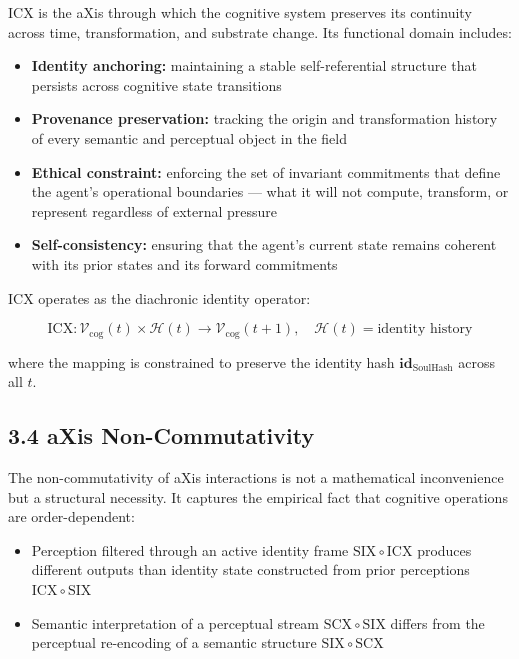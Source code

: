 ICX is the aXis through which the cognitive system preserves its continuity across time, transformation, and substrate change. Its functional domain includes:

\begin{itemize}
\tightlist
\item
  \textbf{Identity anchoring:} maintaining a stable self-referential structure that persists across cognitive state transitions
\item
  \textbf{Provenance preservation:} tracking the origin and transformation history of every semantic and perceptual object in the field
\item
  \textbf{Ethical constraint:} enforcing the set of invariant commitments that define the agent's operational boundaries --- what it will not compute, transform, or represent regardless of external pressure
\item
  \textbf{Self-consistency:} ensuring that the agent's current state remains coherent with its prior states and its forward commitments
\end{itemize}

ICX operates as the diachronic identity operator:

\[
\mathrm{ICX}: \mathcal{V}_{\text{cog}}(t) \times \mathcal{H}(t) \rightarrow
\mathcal{V}_{\text{cog}}(t+1), \quad \mathcal{H}(t) = \text{identity history}
\]

where the mapping is constrained to preserve the identity hash \(\mathbf{id}_{\text{SoulHash}}\) across all \(t\).

\subsection{3.4 aXis Non-Commutativity}\label{axis-non-commutativity}

The non-commutativity of aXis interactions is not a mathematical inconvenience but a structural necessity. It captures the empirical fact that cognitive operations are order-dependent:

\begin{itemize}
\tightlist
\item
  Perception filtered through an active identity frame \(\mathrm{SIX} \circ
  \mathrm{ICX}\) produces different outputs than identity state constructed from prior perceptions \(\mathrm{ICX} \circ \mathrm{SIX}\)
\item
  Semantic interpretation of a perceptual stream \(\mathrm{SCX} \circ \mathrm{SIX}\) differs from the perceptual re-encoding of a semantic structure \(\mathrm{SIX}
  \circ \mathrm{SCX}\)
\end{itemize}

